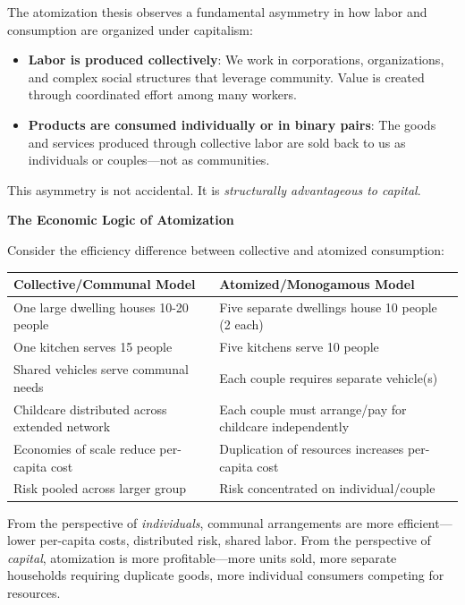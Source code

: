 \documentclass[12pt,openany]{book}
\numberwithin{equation}{chapter}
\begin{document}
The atomization thesis observes a fundamental asymmetry in how labor and consumption are organized under capitalism:

\begin{itemize}
    \item \textbf{Labor is produced collectively}: We work in corporations, organizations, and complex social structures that leverage community. Value is created through coordinated effort among many workers.
    
    \item \textbf{Products are consumed individually or in binary pairs}: The goods and services produced through collective labor are sold back to us as individuals or couples---not as communities.
\end{itemize}

This asymmetry is not accidental. It is \textit{structurally advantageous to capital}.

\textbf{The Economic Logic of Atomization}

Consider the efficiency difference between collective and atomized consumption:

\begin{center}
\begin{tabular}{|p{2.5in}|p{2.5in}|}
\hline
\textbf{Collective/Communal Model} & \textbf{Atomized/Monogamous Model} \\
\hline
One large dwelling houses 10-20 people & Five separate dwellings house 10 people (2 each) \\
\hline
One kitchen serves 15 people & Five kitchens serve 10 people \\
\hline
Shared vehicles serve communal needs & Each couple requires separate vehicle(s) \\
\hline
Childcare distributed across extended network & Each couple must arrange/pay for childcare independently \\
\hline
Economies of scale reduce per-capita cost & Duplication of resources increases per-capita cost \\
\hline
Risk pooled across larger group & Risk concentrated on individual/couple \\
\hline
\end{tabular}
\end{center}

From the perspective of \textit{individuals}, communal arrangements are more efficient---lower per-capita costs, distributed risk, shared labor. From the perspective of \textit{capital}, atomization is more profitable---more units sold, more separate households requiring duplicate goods, more individual consumers competing for resources.
\end{document}
